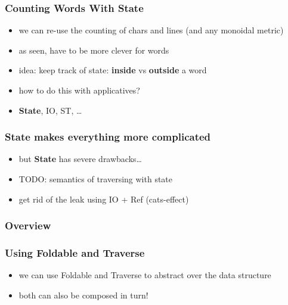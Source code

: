 \documentclass[aspectratio=169]{beamer}
\begin{document}
\begin{frame}
  \frametitle{Counting Words \textemdash{} With State}
  \begin{itemize}
  \item we can re-use the counting of chars and lines (and any monoidal metric)
  \item as seen, have to be more clever for words
  \item idea: keep track of state: \textbf{inside} vs \textbf{outside} a word
  \item how to do this with applicatives?
  \item \textbf{State}, IO, ST, \ldots{}
  \end{itemize}
\end{frame}

\begin{frame}
  \frametitle{State makes everything more complicated}
  \begin{itemize}
  \item but \textbf{State} has severe drawbacks\dots
  \item TODO: semantics of traversing with state
  \item get rid of the leak using IO + Ref (cats-effect)
  \end{itemize}
\end{frame}

\begin{frame}
  \frametitle{Overview}
  \def\firstcircle{(0,0) ellipse (20mm and 5mm)}
  \def\secondcircle{(0,0) ellipse (25mm and 12mm)}
  \def\thirdcircle{(0,0) ellipse (35mm and 20mm)}
  \begin{center}
  \end{center}
\end{frame}

\begin{frame}
  \frametitle{Using Foldable and Traverse}
  \begin{itemize}
  \item we can use Foldable and Traverse to abstract over the data structure
  \item both can also be composed in turn!
  \end{itemize}
\end{frame}
\end{document}
